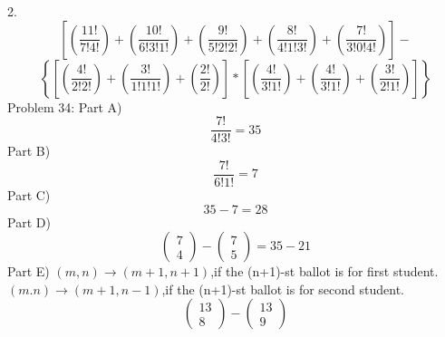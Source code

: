 \documentclass{article}
\begin{document}
	2.
	$$
	\left[
	\left(
	\frac{11!}{7!4!}
	\right)
	+
	\left(
	\frac{10!}{6!3!1!}
	\right)
	+
	\left(
	\frac{9!}{5!2!2!}
	\right)
	+
	\left(
	\frac{8!}{4!1!3!}
	\right)
	+
	\left(
	\frac{7!}{3!0!4!}
	\right)
	\right]
	-
	$$
	$$
	\left\lbrace
	\left[
	\left(
	\frac{4!}{2!2!}
	\right)
	+
	\left(
	\frac{3!}{1!1!1!}
	\right)
	+
	\left(
	\frac{2!}{2!}
	\right)
	\right]
	*
	\left[
	\left(
	\frac{4!}{3!1!}
	\right)
	+
	\left(
	\frac{4!}{3!1!}
	\right)
	+
	\left(
	\frac{3!}{2!1!}
	\right)
	\right]
	\right\rbrace
	$$
	Problem 34: Part A)
	$$
	\frac{7!}{4!3!}=35
	$$
	Part B)
	$$
	\frac{7!}{6!1!}=7
	$$
	Part C)
	$$
	35-7=28
	$$
	Part D)
	$$
	\left(\begin{array}{c}
	7\\
	4
	\end{array}\right)
	-
	\left(\begin{array}{c}
	7\\
	5
	\end{array}\right)
	=
	35-21
	$$
	Part E)
	\newline
	$(m,n) \rightarrow (m+1,n+1) $,if the (n+1)-st ballot is for first student.
	\newline
	$(m.n) \rightarrow (m+1,n-1) $,if the (n+1)-st ballot is for second student.
	$$
	\left(\begin{array}{c}
	13\\
	8
	\end{array}\right)
	-
	\left(\begin{array}{c}
	13\\
	9
	\end{array}\right)
	$$ 
\end{document}
